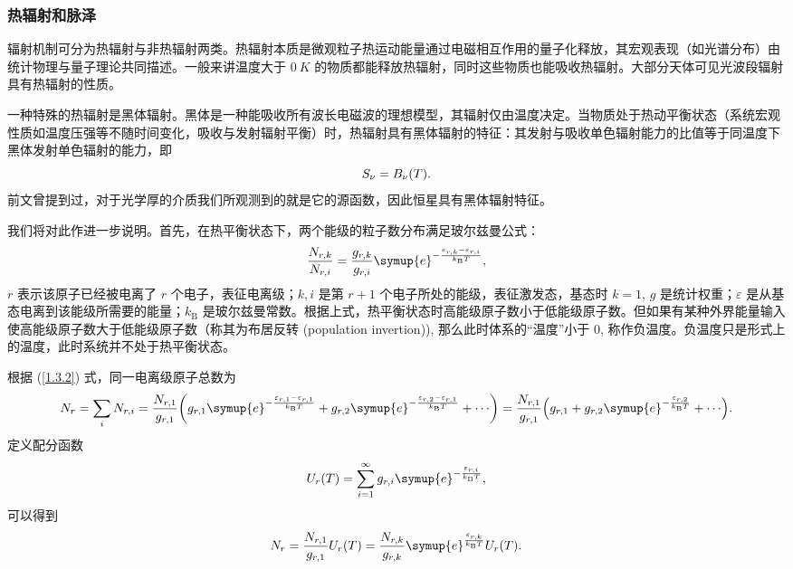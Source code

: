 \documentclass[../天体物理基础.tex]{subfiles}
\begin{document}
\subsubsection{热辐射和脉泽}
辐射机制可分为热辐射与非热辐射两类。热辐射本质是微观粒子热运动能量通过电磁相互作用的量子化释放，其宏观表现（如光谱分布）由统计物理与量子理论共同描述。一般来讲温度大于 $\qty{0}{K}$ 的物质都能释放热辐射，同时这些物质也能吸收热辐射。大部分天体可见光波段辐射具有热辐射的性质。

一种特殊的热辐射是黑体辐射。黑体是一种能吸收所有波长电磁波的理想模型，其辐射仅由温度决定。当物质处于热动平衡状态（系统宏观性质如温度压强等不随时间变化，吸收与发射辐射平衡）时，热辐射具有黑体辐射的特征：其发射与吸收单色辐射能力的比值等于同温度下黑体发射单色辐射的能力，即
\begin{equation}
S_{\nu}=B_{\nu}\mleft(T\mright).
\end{equation}
前文曾提到过，对于光学厚的介质我们所观测到的就是它的源函数，因此恒星具有黑体辐射特征。

我们将对此作进一步说明。首先，在热平衡状态下，两个能级的粒子数分布满足玻尔兹曼公式：
\begin{equation}
\frac{N_{r, k}}{N_{r, i}}=\frac{g_{r, k}}{g_{r, i}}\symup{e}^{-\frac{\varepsilon_{r, k}-\varepsilon_{r, i}}{k_{\mathrm{B}}T}},\label{1.3.2}
\end{equation}
$r$ 表示该原子已经被电离了 $r$ 个电子，表征电离级；$k, i$ 是第 $r+1$ 个电子所处的能级，表征激发态，基态时 $k=1$, $g$ 是统计权重；$\varepsilon$ 是从基态电离到该能级所需要的能量；$k_{\mathrm{B}}$ 是玻尔兹曼常数。根据上式，热平衡状态时高能级原子数小于低能级原子数。但如果有某种外界能量输入使高能级原子数大于低能级原子数（称其为布居反转 (population invertion)), 那么此时体系的“温度”小于 0, 称作负温度。负温度只是形式上的温度，此时系统并不处于热平衡状态。

根据 (\ref{1.3.2}) 式，同一电离级原子总数为
\begin{equation}
N_{r}=\sum_{i}N_{r, i}=\frac{N_{r, 1}}{g_{r, 1}}\mleft(g_{r, 1}\symup{e}^{-\frac{\varepsilon_{r, 1}-\varepsilon_{r, 1}}{k_{\mathrm{B}}T}}+g_{r, 2}\symup{e}^{-\frac{\varepsilon_{r, 2}-\varepsilon_{r, 1}}{k_{\mathrm{B}}T}}+\cdots\mright)=\frac{N_{r, 1}}{g_{r, 1}}\mleft(g_{r, 1}+g_{r, 2}\symup{e}^{-\frac{\varepsilon_{r, 2}}{k_{\mathrm{B}}T}}+\cdots\mright).
\end{equation}
定义配分函数
\begin{equation}
U_{r}\mleft(T\mright)=\sum_{i=1}^{\infty}g_{r, i}\symup{e}^{-\frac{\varepsilon_{r, i}}{k_{\mathrm{B}}T}},
\end{equation}
可以得到
\begin{equation}
N_{r}=\frac{N_{r, 1}}{g_{r, 1}}U_{r}\mleft(T\mright)=\frac{N_{r, k}}{g_{r, k}}\symup{e}^{\frac{\varepsilon_{r, k}}{k_{\mathrm{B}}T}}U_{r}\mleft(T\mright).
\end{equation}
\end{document}
